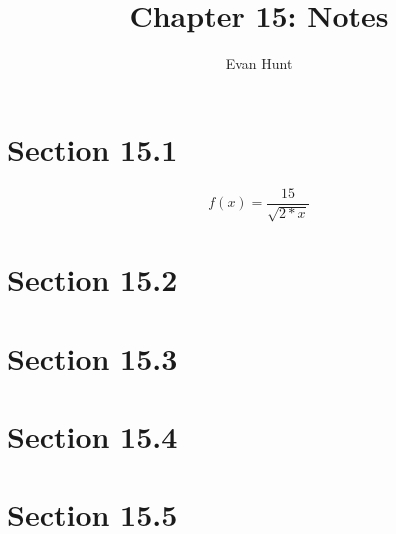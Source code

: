 \documentclass[12pt]{article}
\title{Chapter 15: Notes}
\author{Evan Hunt}
\begin{document}
    \maketitle

    \section[]{Section 15.1}
        \begin{equation}
            f(x) = \frac{15}{\sqrt{2*x}}
        \end{equation}
    \section[]{Section 15.2}
    \section[]{Section 15.3}
    \section[]{Section 15.4}
    \section[]{Section 15.5}
\end{document}
